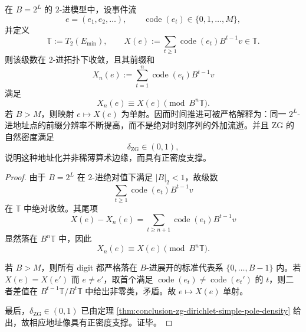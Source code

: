 \begin{corollary}\label{cor:conclusion-time-as-address-resolution-filtration}
在 \(B=2^L\) 的 \(2\)-进模型中，设事件流
\[
e=(e_1,e_2,\dots),
\qquad
\operatorname{code}(e_t)\in\{0,1,\dots,M\},
\]
并定义
\[
\mathbb T:=T_2(E_{\min}),
\qquad
X(e):=\sum_{t\ge 1}\operatorname{code}(e_t)B^{t-1}v\in \mathbb T.
\]
则该级数在 \(2\)-进拓扑下收敛，且其前缀和
\[
X_n(e):=\sum_{t=1}^{n}\operatorname{code}(e_t)B^{t-1}v
\]
满足
\[
X_n(e)\equiv X(e)\pmod{B^n\mathbb T}.
\]
若 \(B>M\)，则映射 \(e\mapsto X(e)\) 为单射。因而时间推进可被严格解释为：同一 \(2^L\)-进地址点的前缀分辨率不断提高，而不是绝对时刻序列的外加流逝。并且 \(\mathrm{ZG}\) 的自然密度满足
\[
\delta_{\mathrm{ZG}}\in(0,1),
\]
说明这种地址化并非稀薄算术边缘，而具有正密度支撑。
\end{corollary}
\begin{proof}
由于 \(B=2^L\) 在 \(2\)-进绝对值下满足 \(|B|_2<1\)，故级数
\[
\sum_{t\ge 1}\operatorname{code}(e_t)B^{t-1}v
\]
在 \(\mathbb T\) 中绝对收敛。其尾项
\[
X(e)-X_n(e)=\sum_{t\ge n+1}\operatorname{code}(e_t)B^{t-1}v
\]
显然落在 \(B^n\mathbb T\) 中，因此
\[
X_n(e)\equiv X(e)\pmod{B^n\mathbb T}.
\]

若 \(B>M\)，则所有 digit 都严格落在 \(B\)-进展开的标准代表系 \(\{0,\dots,B-1\}\) 内。若 \(X(e)=X(e')\) 而 \(e\neq e'\)，取首个满足 \(\operatorname{code}(e_t)\neq \operatorname{code}(e_t')\) 的 \(t\)，则二者差值在 \(B^{t-1}\mathbb T/B^t\mathbb T\) 中给出非零类，矛盾。故 \(e\mapsto X(e)\) 单射。

最后，\(\delta_{\mathrm{ZG}}\in(0,1)\) 已由定理 \ref{thm:conclusion-zg-dirichlet-simple-pole-density} 给出，故相应地址像具有正密度支撑。证毕。
\end{proof}

